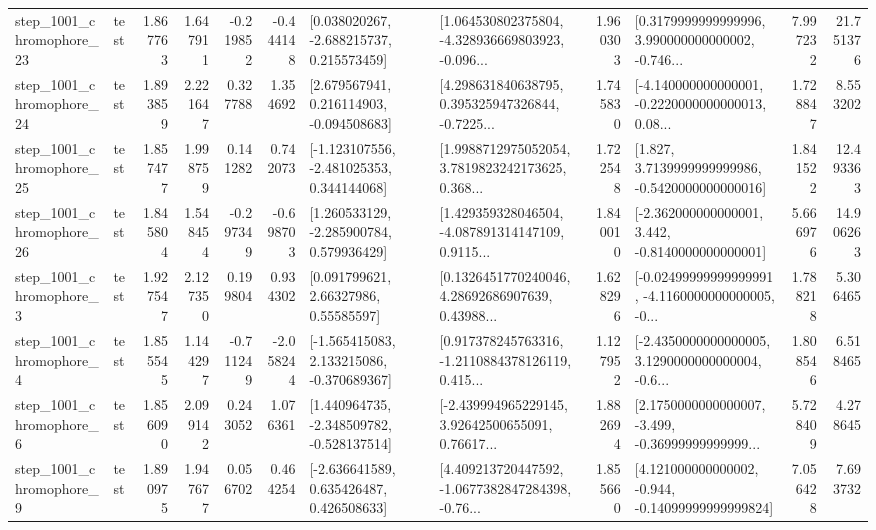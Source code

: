 \begin{tabular}{llrrrrllrlrr}
 step\_1001\_chromophore\_23 &      test &      1.867763 &    1.647911 &     -0.219852 & -0.444148 &    [0.038020267, -2.688215737, 0.215573459] &  [1.064530802375804, -4.328936669803923, -0.096... &       1.960303 &  [0.3179999999999996, 3.990000000000002, -0.746... &            7.997232 &         21.751376 \\
 step\_1001\_chromophore\_24 &      test &      1.893859 &    2.221647 &      0.327788 &  1.354692 &    [2.679567941, 0.216114903, -0.094508683] &  [4.298631840638795, 0.395325947326844, -0.7225... &       1.745830 &  [-4.140000000000001, -0.2220000000000013, 0.08... &            1.728847 &          8.553202 \\
 step\_1001\_chromophore\_25 &      test &      1.857477 &    1.998759 &      0.141282 &  0.742073 &   [-1.123107556, -2.481025353, 0.344144068] &  [1.9988712975052054, 3.7819823242173625, 0.368... &       1.722548 &   [1.827, 3.7139999999999986, -0.5420000000000016] &            1.841522 &         12.493363 \\
 step\_1001\_chromophore\_26 &      test &      1.845804 &    1.548454 &     -0.297349 & -0.698703 &    [1.260533129, -2.285900784, 0.579936429] &  [1.429359328046504, -4.087891314147109, 0.9115... &       1.840010 &   [-2.362000000000001, 3.442, -0.8140000000000001] &            5.666976 &         14.906263 \\
  step\_1001\_chromophore\_3 &      test &      1.927547 &    2.127350 &      0.199804 &  0.934302 &       [0.091799621, 2.66327986, 0.55585597] &  [0.1326451770240046, 4.28692686907639, 0.43988... &       1.628296 &  [-0.02499999999999991, -4.1160000000000005, -0... &            1.788218 &          5.306465 \\
  step\_1001\_chromophore\_4 &      test &      1.855545 &    1.144297 &     -0.711249 & -2.058244 &   [-1.565415083, 2.133215086, -0.370689367] &  [0.917378245763316, -1.2110884378126119, 0.415... &       1.127952 &  [-2.4350000000000005, 3.1290000000000004, -0.6... &            1.808546 &          6.518465 \\
  step\_1001\_chromophore\_6 &      test &      1.856090 &    2.099142 &      0.243052 &  1.076361 &   [1.440964735, -2.348509782, -0.528137514] &  [-2.439994965229145, 3.92642500655091, 0.76617... &       1.882694 &  [2.1750000000000007, -3.499, -0.36999999999999... &            5.728409 &          4.278645 \\
  step\_1001\_chromophore\_9 &      test &      1.890975 &    1.947677 &      0.056702 &  0.464254 &    [-2.636641589, 0.635426487, 0.426508633] &  [4.409213720447592, -1.0677382847284398, -0.76... &       1.855660 &  [4.121000000000002, -0.944, -0.14099999999999824] &            7.056428 &          7.693732 \\

\end{tabular}
